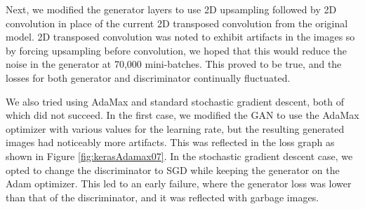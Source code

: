 \documentclass{article} %
\begin{document}
Next, we modified the generator layers to use 2D upsampling followed by 2D convolution in place of the current 2D transposed convolution from the original model.  2D transposed convolution was noted to exhibit artifacts in the images \cite{conv2dArtifacts} so by forcing upsampling before convolution, we hoped that this would reduce the noise in the generator at 70,000 mini-batches.  This proved to be true, and the losses for both generator and discriminator continually fluctuated.

We also tried using AdaMax and standard stochastic gradient descent, both of which did not succeed.  In the first case, we modified the GAN to use the AdaMax optimizer with various values for the learning rate, but the resulting generated images had noticeably more artifacts.  This was reflected in the loss graph as shown in Figure \ref{fig:kerasAdamax07}.  In the stochastic gradient descent case, we opted to change the discriminator to SGD while keeping the generator on the Adam optimizer.  This led to an early failure, where the generator loss was lower than that of the discriminator, and it was reflected with garbage images.
\end{document}
